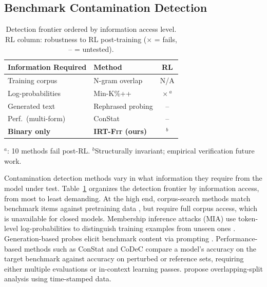 \subsection{Benchmark Contamination Detection}\label{sec:contamination_related}

\begin{table}[t]
\centering
\small
\caption{Detection frontier ordered by information access level. RL column: robustness to RL post-training ($\times$ = fails, -- = untested).}
\label{tab:frontier}
\begin{tabular}{@{}llc@{}}
\toprule
Information Required & Method & RL \\
\midrule
Training corpus & N-gram overlap \citep{dodge2021} & N/A \\
Log-probabilities & Min-K\%++ \citep{minkprob2024} & $\times$\,$^{a}$ \\
Generated text & Rephrased probing \citep{golchin2024} & -- \\
Perf.\ (multi-form) & ConStat \citep{constat2024} & -- \\
\textbf{Binary only} & \textbf{IRT-\textsc{Fit} (ours)} & $^{b}$ \\
\bottomrule
\end{tabular}

{\raggedright\scriptsize $^{a}$\citet{wang2025fragility}: 10 methods fail post-RL.
$^{b}$Structurally invariant; empirical verification future work.\par}
\end{table}

Contamination detection methods vary in what information they require from the model under test.
Table~\ref{tab:frontier} organizes the detection frontier by information access, from most to least demanding.
At the high end, corpus-search methods match benchmark items against pretraining data \citep{dodge2021, magar2022}, but require full corpus access, which is unavailable for closed models.
Membership inference attacks (MIA) use token-level log-probabilities to distinguish training examples from unseen ones \citep{minkprob2024, deng2024}.
Generation-based probes elicit benchmark content via prompting \citep{golchin2024, oren2024}.
Performance-based methods such as ConStat \citep{constat2024} and CoDeC \citep{codec2026} compare a model's accuracy on the target benchmark against accuracy on perturbed or reference sets, requiring either multiple evaluations or in-context learning passes.
\citet{sainz2023} propose overlapping-split analysis using time-stamped data.

